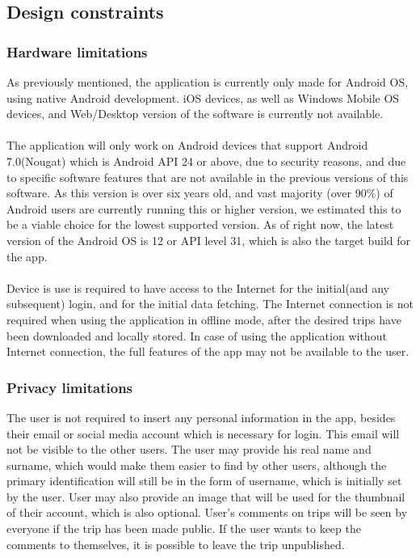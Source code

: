 \subsection{Design constraints}
\subsubsection{Hardware limitations}
\hspace{\parindent}As previously mentioned, the application is currently only made for Android OS, using native Android development. iOS devices, as well as Windows Mobile OS devices, and Web/Desktop version of the software is currently not available.\\ \\
The application will only work on Android devices that support Android 7.0(Nougat) which is Android API 24 or above, due to security reasons, and due to specific software features that are not available in the previous versions of this software. As this version is over six years old, and vast majority (over 90\%) of Android users are currently running this or higher version, we estimated this to be a viable choice for the lowest supported version. As of right now, the latest version of the Android OS is 12 or API level 31, which is also the target build for the app.\\ \\
Device is use is required to have access to the Internet for the initial(and any subsequent) login, and for the initial data fetching. The Internet connection is not required when using the application in offline mode, after the desired trips have been downloaded and locally stored. In case of using the application without Internet connection, the full features of the app may not be available to the user.

\subsubsection{Privacy limitations}
\hspace{\parindent}The user is not required to insert any personal information in the app, besides their email or social media account which is necessary for login. This email will not be visible to the other users. The user may provide his real name and surname, which would make them easier to find by other users, although the primary identification will still be in the form of username, which is initially set by the user. User may also provide an image that will be used for the thumbnail of their account, which is also optional. User's comments on trips will be seen by everyone if the trip has been made public. If the user wants to keep the comments to themselves, it is possible to leave the trip unpublished.
